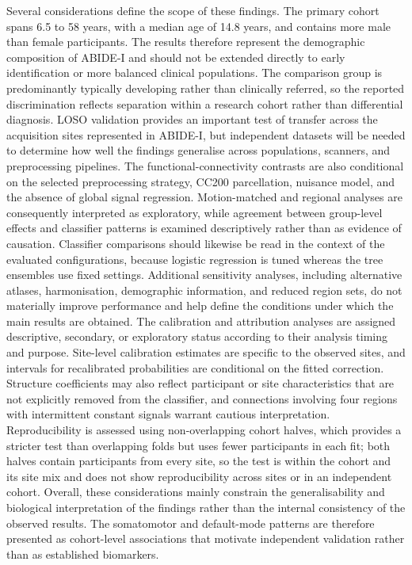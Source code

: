 Several considerations define the scope of these findings. The primary cohort spans 6.5 to 58 years, with a median age of 14.8 years, and contains more male than female participants. The results therefore represent the demographic composition of ABIDE-I and should not be extended directly to early identification or more balanced clinical populations. The comparison group is predominantly typically developing rather than clinically referred, so the reported discrimination reflects separation within a research cohort rather than differential diagnosis. LOSO validation provides an important test of transfer across the acquisition sites represented in ABIDE-I, but independent datasets will be needed to determine how well the findings generalise across populations, scanners, and preprocessing pipelines. The functional-connectivity contrasts are also conditional on the selected preprocessing strategy, CC200 parcellation, nuisance model, and the absence of global signal regression. Motion-matched and regional analyses are consequently interpreted as exploratory, while agreement between group-level effects and classifier patterns is examined descriptively rather than as evidence of causation. Classifier comparisons should likewise be read in the context of the evaluated configurations, because logistic regression is tuned whereas the tree ensembles use fixed settings. Additional sensitivity analyses, including alternative atlases, harmonisation, demographic information, and reduced region sets, do not materially improve performance and help define the conditions under which the main results are obtained. The calibration and attribution analyses are assigned descriptive, secondary, or exploratory status according to their analysis timing and purpose. Site-level calibration estimates are specific to the observed sites, and intervals for recalibrated probabilities are conditional on the fitted correction. Structure coefficients may also reflect participant or site characteristics that are not explicitly removed from the classifier, and connections involving four regions with intermittent constant signals warrant cautious interpretation. Reproducibility is assessed using non-overlapping cohort halves, which provides a stricter test than overlapping folds but uses fewer participants in each fit; both halves contain participants from every site, so the test is within the cohort and its site mix and does not show reproducibility across sites or in an independent cohort. Overall, these considerations mainly constrain the generalisability and biological interpretation of the findings rather than the internal consistency of the observed results. The somatomotor and default-mode patterns are therefore presented as cohort-level associations that motivate independent validation rather than as established biomarkers.

